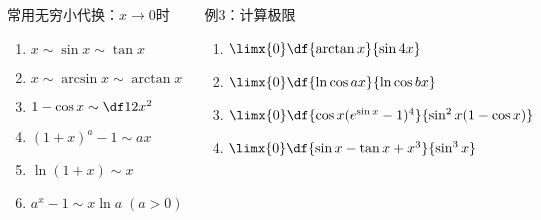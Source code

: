 
\begin{frame}
	\linespread{1.2}\pause 
	\begin{columns}[t]
		\begin{alertblock}{常用无穷小代换：\pause $x\to 0$时}\pause 
		\begin{enumerate}
		  \item $x\sim \sin x\sim \tan x$\pause 
		  \item $x \sim\arcsin x\sim\arctan x$\pause 
		  \item $1-\cos x\sim \df 12 x^2$\pause 
		  \item $(1+x)^a-1\sim ax$\pause 
		  \item $\ln(1+x)\sim x$\pause 
		  \item $a^x-1\sim x\ln a\;(a>0)$\pause 
		\end{enumerate}
	\end{alertblock}
 		\begin{exampleblock}{例3：计算极限}
			\begin{enumerate}
			  \item $\limx{0}\df{\arctan x}{\sin 4x}$\pause 
			  \item $\limx{0}\df{\ln\cos ax}{\ln\cos bx}$\pause 
			  \item $\limx{0}\df{\cos x(e^{\sin x}-1)^4}{\sin^2 x(1-\cos x)}$\pause 
			  \item $\limx{0}\df{\sin x-\tan x+x^3}{\sin^3 x}$\pause 
			\end{enumerate}
 		\end{exampleblock}
	\end{columns}
	\bigskip
	\centerline{}
\end{frame}

